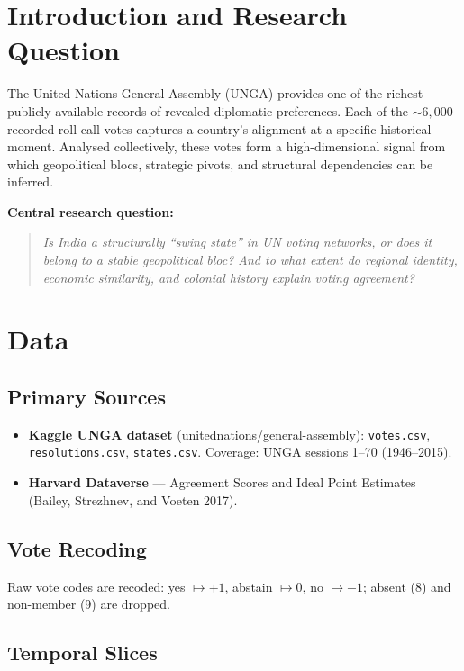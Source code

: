 \documentclass[12pt,a4paper]{article}
\begin{document}
\section{Introduction and Research Question}

The United Nations General Assembly (UNGA) provides one of the richest
publicly available records of revealed diplomatic preferences.
Each of the $\sim\!6{,}000$ recorded roll-call votes captures a country's
alignment at a specific historical moment.
Analysed collectively, these votes form a high-dimensional signal from which
geopolitical blocs, strategic pivots, and structural dependencies can be inferred.

\medskip
\noindent\textbf{Central research question:}
\begin{quote}
  \textit{Is India a structurally ``swing state'' in UN voting networks,
  or does it belong to a stable geopolitical bloc?
  And to what extent do regional identity, economic similarity,
  and colonial history explain voting agreement?}
\end{quote}

\section{Data}

\subsection{Primary Sources}
\begin{itemize}[noitemsep]
  \item \textbf{Kaggle UNGA dataset} (unitednations/general-assembly):
        \texttt{votes.csv}, \texttt{resolutions.csv}, \texttt{states.csv}.
        Coverage: UNGA sessions 1--70 (1946--2015).
  \item \textbf{Harvard Dataverse} — Agreement Scores and Ideal Point
        Estimates (Bailey, Strezhnev, and Voeten 2017).
\end{itemize}

\subsection{Vote Recoding}
Raw vote codes are recoded: yes $\mapsto +1$, abstain $\mapsto 0$,
no $\mapsto -1$; absent (8) and non-member (9) are dropped.

\subsection{Temporal Slices}
\begin{center}
\end{center}
\end{document}
